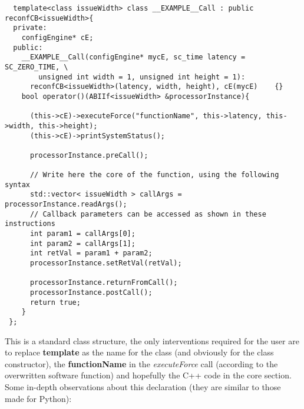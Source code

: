 \scriptsize
\begin{verbatim}
  template<class issueWidth> class __EXAMPLE__Call : public reconfCB<issueWidth>{
  private:
    configEngine* cE;
  public:
    __EXAMPLE__Call(configEngine* mycE, sc_time latency = SC_ZERO_TIME, \
        unsigned int width = 1, unsigned int height = 1):
      reconfCB<issueWidth>(latency, width, height), cE(mycE)	{}
    bool operator()(ABIIf<issueWidth> &processorInstance){

      (this->cE)->executeForce("functionName", this->latency, this->width, this->height);
      (this->cE)->printSystemStatus();

      processorInstance.preCall();

      // Write here the core of the function, using the following syntax
      std::vector< issueWidth > callArgs = processorInstance.readArgs();
      // Callback parameters can be accessed as shown in these instructions
      int param1 = callArgs[0];
      int param2 = callArgs[1];
      int retVal = param1 + param2;
      processorInstance.setRetVal(retVal);

      processorInstance.returnFromCall();
      processorInstance.postCall();
      return true;
    }
 };
\end{verbatim}
\normalsize
This is a standard class structure, the only interventions required for the user are to replace \textbf{template} as the name for the class (and obviously for the class constructor), the \mbox{\textbf{functionName}} in the \mbox{\textit{executeForce}} call (according to the overwritten software function) and hopefully the C++ code in the core section.\\
\indent Some in-depth observations about this declaration (they are similar to those made for Python):
